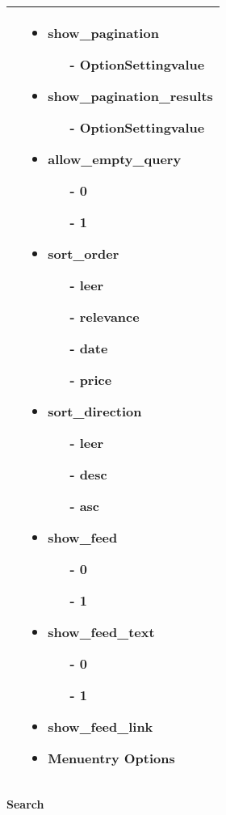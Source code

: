 \begin{minipage}{0.7\textwidth}
\begin{tabular}{|p{} | p{}|}
 & 
\begin{itemize}
\item show\_pagination
\begin{enumerate}
 	\item[-] OptionSettingvalue
 \end{enumerate}
\item show\_pagination\_results
\begin{enumerate}
 	\item[-] OptionSettingvalue
 \end{enumerate} 
\item allow\_empty\_query
\begin{enumerate}
 	\item[-] 0
 	\item[-] 1
 \end{enumerate} 
\item sort\_order
\begin{enumerate}
 	\item[-] leer
 	\item[-] relevance
 	\item[-] date
 	\item[-] price
 \end{enumerate} 
\item sort\_direction
\begin{enumerate}
 	\item[-] leer
 	\item[-] desc
 	\item[-] asc
 \end{enumerate} 
\item show\_feed
\begin{enumerate}
 	\item[-] 0
 	\item[-] 1
 \end{enumerate} 
\item show\_feed\_text
\begin{enumerate}
 	\item[-] 0
 	\item[-] 1
 \end{enumerate} 
\item show\_feed\_link 
\item Menuentry Options
\end{itemize}
\\
\hline
\end{tabular}
\end{minipage}

\textbf{Search}

